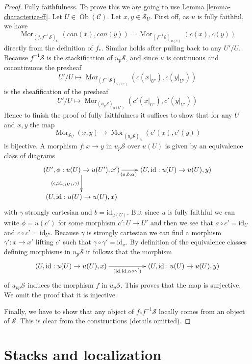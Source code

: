 \documentclass{stacks-project}
\theoremstyle{plain}
\theoremstyle{definition}
\theoremstyle{remark}
\numberwithin{equation}{subsection}
\def\Mor{\mathop{\mathrm{Mor}}\nolimits}
\def\Ob{\mathop{\mathrm{Ob}}\nolimits}
\begin{document}
\begin{proof}
\medskip\noindent
Fully faithfulness. To prove this we are going to use
Lemma \ref{lemma-characterize-ff}.
Let $U \in \Ob(\mathcal{C})$.
Let $x, y \in \mathcal{S}_U$.
First off, as $u$ is fully faithful, we have
$$
\Mor_{(f_*f^{-1}\mathcal{S})_U}(can(x), can(y))
=
\Mor_{(f^{-1}\mathcal{S})_{u(U)}}(c(x), c(y))
$$
directly from the definition of $f_*$. Similar holds after
pulling back to any $U'/U$. Because $f^{-1}\mathcal{S}$ is the
stackification of $u_p\mathcal{S}$, and since $u$ is continuous
and cocontinuous the presheaf
$$
U'/U \longmapsto
\Mor_{(f^{-1}\mathcal{S})_{u(U')}}(c(x|_{U'}), c(y|_{U'}))
$$
is the sheafification of the presheaf
$$
U'/U \longmapsto
\Mor_{(u_p\mathcal{S})_{u(U')}}(c'(x|_{U'}), c'(y|_{U'}))
$$
Hence to finish the proof of fully faithfulness it suffices
to show that for any $U$ and $x, y$ the map
$$
\Mor_{\mathcal{S}_U}(x, y)
\longrightarrow
\Mor_{(u_p\mathcal{S})_U}(c'(x), c'(y))
$$
is bijective. A morphism $f : x \to y$ in $u_p\mathcal{S}$ over $u(U)$
is given by an equivalence class of diagrams
$$
\xymatrix{
(U', \phi : u(U) \to u(U'), x')
\ar[d]_{(c, \text{id}_{u(U)}, \gamma)}
\ar[r]_{(a, b, \alpha)} &
(U, \text{id} : u(U) \to u(U), y)
\\
(U, \text{id} : u(U) \to u(U), x)
}
$$
with $\gamma$ strongly cartesian and $b = \text{id}_{u(U)}$.
But since $u$ is fully faithful we can write $\phi = u(c')$ for some
morphism $c' : U \to U'$
and then we see that $a \circ c' = \text{id}_U$ and
$c \circ c' = \text{id}_{U'}$. Because $\gamma$ is strongly cartesian
we can find a morphism $\gamma' : x \to x'$ lifting $c'$ such that
$\gamma \circ \gamma' = \text{id}_x$. By definition of the equivalence
classes defining morphisms in $u_p\mathcal{S}$ it follows that
the morphism
$$
\xymatrix{
(U, \text{id} : u(U) \to u(U), x)
\ar[rr]_{(\text{id}, \text{id}, \alpha \circ \gamma')} & &
(U, \text{id} : u(U) \to u(U), y)
}
$$
of $u_{pp}\mathcal{S}$ induces the morphism $f$ in $u_p\mathcal{S}$.
This proves that the map is surjective. We omit the proof that it is
injective.

\medskip\noindent
Finally, we have to show that any object of $f_*f^{-1}\mathcal{S}$
locally comes from an object of $\mathcal{S}$. This is clear from the
constructions (details omitted).
\end{proof}




\section{Stacks and localization}
\label{section-localize}
\end{document}
